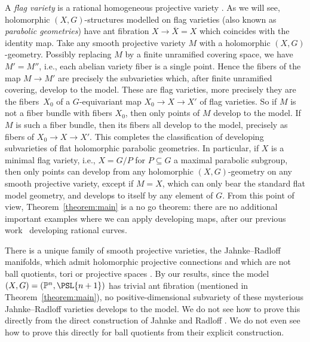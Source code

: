 \documentclass[10pt,a4paper]{amsart}
\providecommand{\Proj}{}
\numberwithin{equation}{section}
\renewcommand{\Proj}[1]{{\mathbb{P}^{#1}}}
\begin{document}
\begin{Example}
A \emph{flag variety} is a rational homogeneous projective variety \cite{Alekseevsky:1997}.
As we will see, holomorphic $(X, G)$-structures modelled on flag varieties (also known as \emph{parabolic geometries}) have
ant fibration $X \longrightarrow \overline{X} = X$ which coincides with the identity map.
Take any smooth projective variety $M$ with a holomorphic $(X, G)$-geometry.
Possibly replacing $M$ by a finite unramified covering space, we
have $M' = M''$, i.e., each abelian variety fiber is a single point.
Hence the fibers of the map $M\to M'$ are precisely the subvarieties which, after finite unramified covering, develop to the model.
These are flag varieties, more precisely they are the fibers~$X_0$ of a $G$-equivariant map $X_0\to X\to X'$ of flag varieties.
So if $M$ is not a fiber bundle with fibers $X_0$, then only points of $M$ develop to the model.
If $M$ is such a fiber bundle, then its fibers all develop to the model, precisely as fibers of $X_0\to X\to X'$.
This completes the classification of developing subvarieties of flat holomorphic parabolic geometries. In particular, if $X$ is
a minimal flag variety, i.e., $X = G/P$ for $P \subseteq G$ a maximal parabolic subgroup, then only points can develop from
any holomorphic $(X, G)$-geometry on any smooth projective variety, except if $M = X$, which can only bear the standard flat
model geometry, and develops to itself by any element of $G$. From this point of view, Theorem~\ref{theorem:main} is a no go
theorem: there are no additional important examples where we can apply developing maps, after our previous work~\cite{Biswas.McKay:2016} developing rational curves.
\end{Example}

\begin{Example}
There is a unique family of smooth projective varieties, the Jahnke--Radloff manifolds, which admit holomorphic projective connections and
which are not ball quotients, tori or projective spaces \cite{Jahnke/Radloff:2015}. By our results, since the model
$(X, G) = (\Proj{n}, \PSL{n+1})$ has trivial ant fibration (mentioned in Theorem~\ref{theorem:main}), no positive-dimensional
subvariety of these mysterious Jahnke--Radloff varieties develops to the model. We do not see how to prove this directly from the direct
construction of Jahnke and Radloff \cite{Jahnke/Radloff:2015}. We do not even see how to prove this directly for ball quotients from their
explicit construction.
\end{Example}
\end{document}
